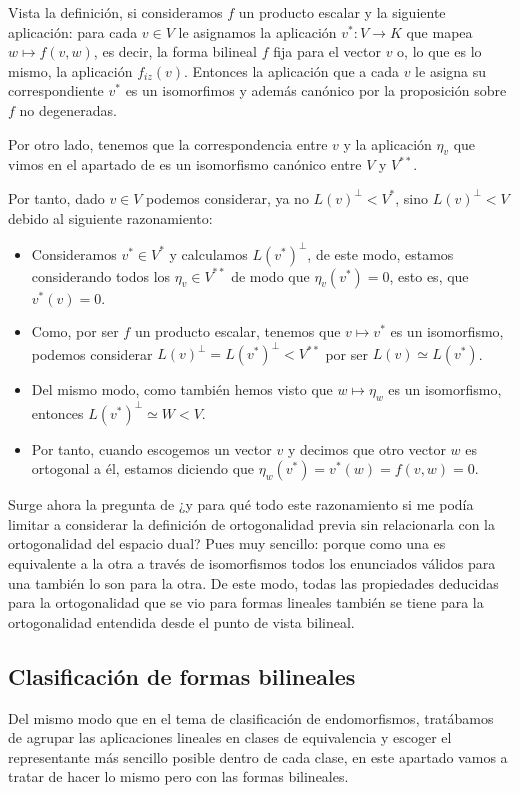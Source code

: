 \documentclass[10pt,a4paper,openright]{book}
\theoremstyle{break}
\begin{document}
Vista la definición, si consideramos $f$ un producto escalar y la siguiente aplicación:
para cada $v\in V$ le asignamos la aplicación $v^*: V \rightarrow K$ que mapea $w\mapsto f(v,w)$, es decir, la forma bilineal $f$ fija para el vector $v$ o, lo que es lo mismo, la aplicación $f_{iz}(v)$. Entonces la aplicación que a cada $v$ le asigna su correspondiente $v^*$ es un isomorfimos y además canónico por la proposición sobre $f$ no degeneradas.

Por otro lado, tenemos que la correspondencia entre $v$ y la aplicación $\eta_v$ que vimos en el apartado de  es un isomorfismo canónico entre $V$ y $V^{**}$.

Por tanto, dado $v\in V$ podemos considerar, ya no $L(v)^\perp < V^*$, sino $L(v)^\perp < V$ debido al siguiente razonamiento:
\begin{itemize}
\item Consideramos $v^*\in V^*$ y calculamos $L(v^*)^\perp$, de este modo, estamos considerando todos los $\eta_v\in V^{**}$ de modo que $\eta_v(v^*) = 0$, esto es, que $v^*(v) = 0$.
\item Como, por ser $f$ un producto escalar, tenemos que $v\mapsto v^*$ es un isomorfismo, podemos considerar $L(v)^\perp = L(v^*)^\perp < V^{**}$ por ser $L(v)\simeq L(v^*)$.
\item Del mismo modo, como también hemos visto que $w\mapsto \eta_w$ es un isomorfismo, entonces $L(v^*)^\perp \simeq W < V$.
\item Por tanto, cuando escogemos un vector $v$ y decimos que otro vector $w$ es ortogonal a él, estamos diciendo que $\eta_w(v^*) = v^*(w)= f(v,w) = 0 $.
\end{itemize}
Surge ahora la pregunta de ¿y para qué todo este razonamiento si me podía limitar a considerar la definición de ortogonalidad previa sin relacionarla con la ortogonalidad del espacio dual? Pues muy sencillo: porque como una es equivalente a la otra a través de isomorfismos todos los enunciados válidos para una también lo son para la otra. De este modo, todas las propiedades deducidas para la ortogonalidad que se vio para formas lineales también se tiene para la ortogonalidad entendida desde el punto de vista bilineal.

\subsection{Clasificación de formas bilineales}
Del mismo modo que en el tema de clasificación de endomorfismos, tratábamos de agrupar las aplicaciones lineales en clases de equivalencia y escoger el representante más sencillo posible dentro de cada clase, en este apartado vamos a tratar de hacer lo mismo pero con las formas bilineales.
\end{document}
